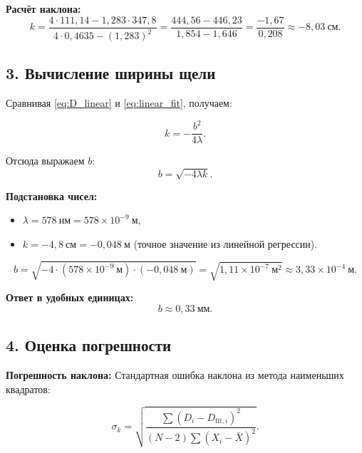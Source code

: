 \documentclass[a4paper]{article}
\begin{document}
\textbf{Расчёт наклона:}
\begin{equation}
    k = \frac{4 \cdot 111,14 - 1,283 \cdot 347,8}{4 \cdot 0,4635 - (1,283)^2} = \frac{444,56 - 446,23}{1,854 - 1,646} = \frac{-1,67}{0,208} \approx -8,03~\text{см}.
\end{equation}

\subsection*{3. Вычисление ширины щели}

Сравнивая \eqref{eq:D_linear} и \eqref{eq:linear_fit}, получаем:

\begin{equation}
    k = -\frac{b^2}{4\lambda}.
    \label{eq:slope_physical}
\end{equation}

Отсюда выражаем $b$:
\begin{equation}
    b = \sqrt{-4\lambda k}.
    \label{eq:b_final}
\end{equation}

\textbf{Подстановка чисел:}
\begin{itemize}
    \item $\lambda = 578~\text{нм} = 578 \times 10^{-9}~\text{м}$,
    \item $k = -4,8~\text{см} = -0,048~\text{м}$ (точное значение из линейной регрессии).
\end{itemize}

\begin{equation}
    b = \sqrt{-4 \cdot (578 \times 10^{-9}~\text{м}) \cdot (-0,048~\text{м})} = \sqrt{1,11 \times 10^{-7}~\text{м}^2} \approx 3,33 \times 10^{-4}~\text{м}.
\end{equation}

\textbf{Ответ в удобных единицах:}
\begin{equation}
    \boxed{b \approx 0,33~\text{мм}}.
\end{equation}

\subsection*{4. Оценка погрешности}

\textbf{Погрешность наклона:} Стандартная ошибка наклона из метода наименьших квадратов:

\begin{equation}
    \sigma_k = \sqrt{\frac{\sum (D_i - D_{\text{fit},i})^2}{(N-2) \sum (X_i - \bar{X})^2}}.
\end{equation}
\end{document}
